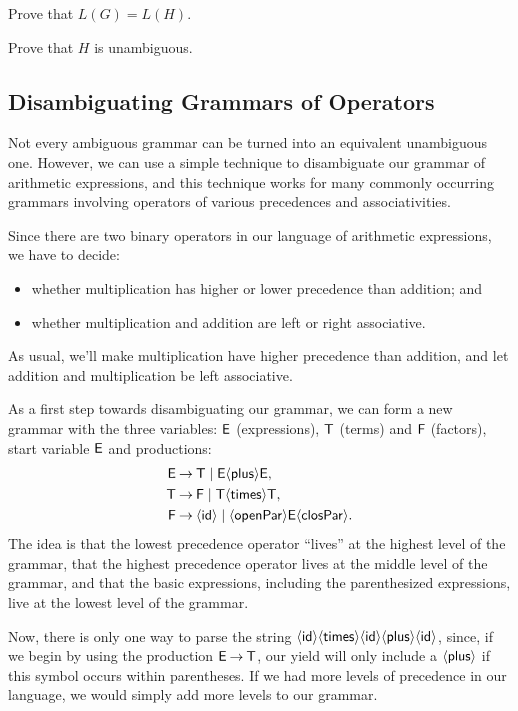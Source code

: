 \begin{exercise}
Prove that $L(G) = L(H)$.
\end{exercise}

\begin{exercise}
Prove that $H$ is unambiguous.
\end{exercise}

\subsection{Disambiguating Grammars of Operators}

%
Not every ambiguous grammar can be turned into an equivalent
unambiguous one.  However, we can use a simple technique to
disambiguate our grammar of arithmetic expressions, and this technique
works for many commonly occurring grammars involving operators of
various precedences and associativities.

Since there are two binary operators in our language of arithmetic
expressions, we have to decide:
\begin{itemize}
\item whether multiplication has higher or lower precedence than
  addition; and

\item whether multiplication and addition are left or right
  associative.
\end{itemize}
As usual, we'll make multiplication have higher precedence than
addition, and let addition and multiplication be left associative.

As a first step towards disambiguating our grammar, we can form
a new grammar with the three variables: $\mathsf{E}$ (expressions),
$\mathsf{T}$ (terms) and $\mathsf{F}$ (factors), start variable $\mathsf{E}$
and productions:
\begin{align*}
  \mathsf{E} &\mathbin{\to} \mathsf{T}\mid \mathsf{E}{\langle\mathsf{plus}\rangle}\mathsf{E} , \\
  \mathsf{T} &\mathbin{\to} \mathsf{F}\mid \mathsf{T}{\langle\mathsf{times}\rangle}\mathsf{T} , \\
  \mathsf{F} &\mathbin{\to} {\langle\mathsf{id}\rangle} \mid {\langle\mathsf{openPar}\rangle}\mathsf{E}{\langle\mathsf{closPar}\rangle} .
\end{align*}
The idea is that the lowest precedence operator ``lives'' at the
highest level of the grammar, that the highest precedence operator
lives at the middle level of the grammar, and that the basic
expressions, including the parenthesized expressions, live at
the lowest level of the grammar.

Now, there is only one way to parse the string
${\langle\mathsf{id}\rangle}{\langle\mathsf{times}\rangle}{\langle\mathsf{id}\rangle}{\langle\mathsf{plus}\rangle}{\langle\mathsf{id}\rangle}$, since, if we begin
by using the production $\mathsf{E}\mathbin{\to}\mathsf{T}$, our yield will only
include a ${\langle\mathsf{plus}\rangle}$ if this symbol occurs within parentheses.
If we had more levels of precedence in our language, we would simply
add more levels to our grammar.

